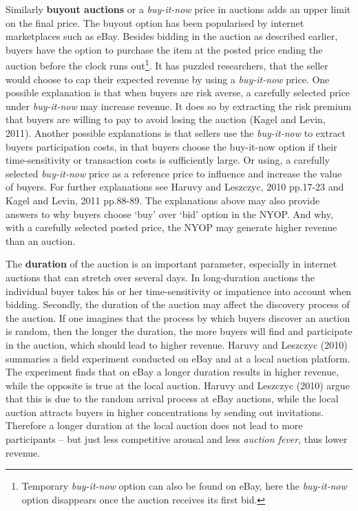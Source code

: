 \documentclass[a4paper,12pt]{article}
\begin{document}
	Similarly {\bf buyout auctions} or a {\it buy-it-now} price in auctions adds an upper limit on the final price. The buyout option has been popularised by internet marketplaces such as eBay. Besides bidding in the auction as described earlier, buyers have the option to purchase the item at the posted price ending the auction before the clock runs out\footnote{Temporary {\it buy-it-now} option can also be found on eBay, here the {\it buy-it-now} option disappears once the auction receives its first bid.}. It has puzzled researchers, that the seller would choose to cap their expected revenue by using a {\it buy-it-now} price. One possible explanation is that when buyers are risk averse, a carefully selected price under {\it buy-it-now} may increase revenue. It does so by extracting the risk premium that buyers are willing to pay to avoid losing the auction (Kagel and Levin, 2011). Another possible explanations is that sellers use the {\it buy-it-now} to extract buyers participation costs, in that buyers choose the buy-it-now option if their time-sensitivity or transaction costs is sufficiently large. Or using, a carefully selected {\it buy-it-now} price as a reference price to influence and increase the value of buyers. For further explanations see Haruvy and Leszczyc, 2010 pp.17-23 and Kagel and Levin, 2011 pp.88-89. The explanations above may also provide answers to why buyers choose `buy' over `bid' option in the NYOP. And why, with a carefully selected posted price, the NYOP may generate higher revenue than an auction.

	The {\bf duration} of the auction is an important parameter, especially in internet auctions that can stretch over several days. In long-duration auctions the individual buyer takes his or her time-sensitivity or impatience into account when bidding. Secondly, the duration of the auction may affect the discovery process of the auction. If one imagines that the process by which buyers discover an auction is random, then the longer the duration, the more buyers will find and participate in the auction, which should lead to higher revenue. Haruvy and Leszczyc (2010) summaries a field experiment conducted on eBay and at a local auction platform. The experiment finds that on eBay a longer duration results in higher revenue, while the opposite is true at the local auction. Haruvy and Leszczyc (2010) argue that this is due to the random arrival process at eBay auctions, while the local auction attracts buyers in higher concentrations by sending out invitations. Therefore a longer duration at the local auction does not lead to more participants -- but just less competitive arousal and less \emph{auction fever}, thus lower revenue.
\end{document}
